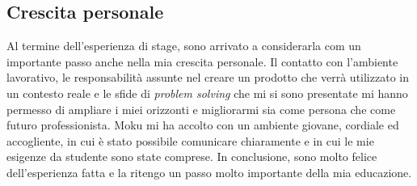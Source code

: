 \subsection{Crescita personale}
Al termine dell'esperienza di stage, sono arrivato a considerarla com un importante passo anche nella mia crescita personale. Il contatto con l'ambiente lavorativo, le responsabilità assunte nel creare un prodotto che verrà utilizzato in un contesto reale e le sfide di \textit{problem solving} che mi si sono presentate mi hanno permesso di ampliare i miei orizzonti e migliorarmi sia come persona che come futuro professionista. Moku mi ha accolto con un ambiente giovane, cordiale ed accogliente, in cui è stato possibile comunicare chiaramente e in cui le mie esigenze da studente sono state comprese. In conclusione, sono molto felice dell'esperienza fatta e la ritengo un passo molto importante della mia educazione.